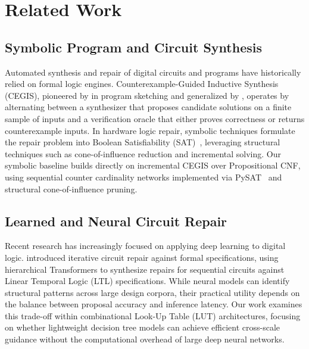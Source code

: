 \documentclass[11pt]{article}
\begin{document}
\section{Related Work}

\subsection{Symbolic Program and Circuit Synthesis}
Automated synthesis and repair of digital circuits and programs have historically relied on formal logic engines. Counterexample-Guided Inductive Synthesis (CEGIS), pioneered by \citet{solar2006combinatorial} in program sketching and generalized by \citet{jha2010oracle}, operates by alternating between a synthesizer that proposes candidate solutions on a finite sample of inputs and a verification oracle that either proves correctness or returns counterexample inputs. In hardware logic repair, symbolic techniques formulate the repair problem into Boolean Satisfiability (SAT)~\citep{smith2005fault}, leveraging structural techniques such as cone-of-influence reduction and incremental solving. Our symbolic baseline builds directly on incremental CEGIS over Propositional CNF, using sequential counter cardinality networks implemented via PySAT~\citep{ignatiev2018pysat} and structural cone-of-influence pruning.

\subsection{Learned and Neural Circuit Repair}
Recent research has increasingly focused on applying deep learning to digital logic. \citet{cosler2023iterative} introduced iterative circuit repair against formal specifications, using hierarchical Transformers to synthesize repairs for sequential circuits against Linear Temporal Logic (LTL) specifications. While neural models can identify structural patterns across large design corpora, their practical utility depends on the balance between proposal accuracy and inference latency. Our work examines this trade-off within combinational Look-Up Table (LUT) architectures, focusing on whether lightweight decision tree models can achieve efficient cross-scale guidance without the computational overhead of large deep neural networks.
\end{document}
